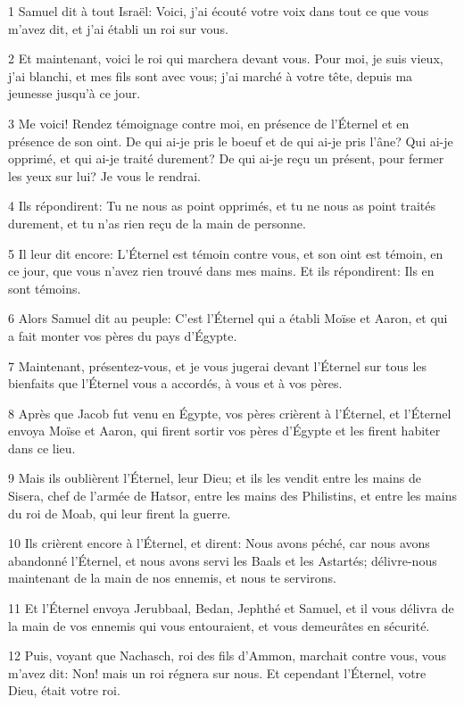 \par 1 Samuel dit à tout Israël: Voici, j'ai écouté votre voix dans tout ce que vous m'avez dit, et j'ai établi un roi sur vous.
\par 2 Et maintenant, voici le roi qui marchera devant vous. Pour moi, je suis vieux, j'ai blanchi, et mes fils sont avec vous; j'ai marché à votre tête, depuis ma jeunesse jusqu'à ce jour.
\par 3 Me voici! Rendez témoignage contre moi, en présence de l'Éternel et en présence de son oint. De qui ai-je pris le boeuf et de qui ai-je pris l'âne? Qui ai-je opprimé, et qui ai-je traité durement? De qui ai-je reçu un présent, pour fermer les yeux sur lui? Je vous le rendrai.
\par 4 Ils répondirent: Tu ne nous as point opprimés, et tu ne nous as point traités durement, et tu n'as rien reçu de la main de personne.
\par 5 Il leur dit encore: L'Éternel est témoin contre vous, et son oint est témoin, en ce jour, que vous n'avez rien trouvé dans mes mains. Et ils répondirent: Ils en sont témoins.
\par 6 Alors Samuel dit au peuple: C'est l'Éternel qui a établi Moïse et Aaron, et qui a fait monter vos pères du pays d'Égypte.
\par 7 Maintenant, présentez-vous, et je vous jugerai devant l'Éternel sur tous les bienfaits que l'Éternel vous a accordés, à vous et à vos pères.
\par 8 Après que Jacob fut venu en Égypte, vos pères crièrent à l'Éternel, et l'Éternel envoya Moïse et Aaron, qui firent sortir vos pères d'Égypte et les firent habiter dans ce lieu.
\par 9 Mais ils oublièrent l'Éternel, leur Dieu; et ils les vendit entre les mains de Sisera, chef de l'armée de Hatsor, entre les mains des Philistins, et entre les mains du roi de Moab, qui leur firent la guerre.
\par 10 Ils crièrent encore à l'Éternel, et dirent: Nous avons péché, car nous avons abandonné l'Éternel, et nous avons servi les Baals et les Astartés; délivre-nous maintenant de la main de nos ennemis, et nous te servirons.
\par 11 Et l'Éternel envoya Jerubbaal, Bedan, Jephthé et Samuel, et il vous délivra de la main de vos ennemis qui vous entouraient, et vous demeurâtes en sécurité.
\par 12 Puis, voyant que Nachasch, roi des fils d'Ammon, marchait contre vous, vous m'avez dit: Non! mais un roi régnera sur nous. Et cependant l'Éternel, votre Dieu, était votre roi.
